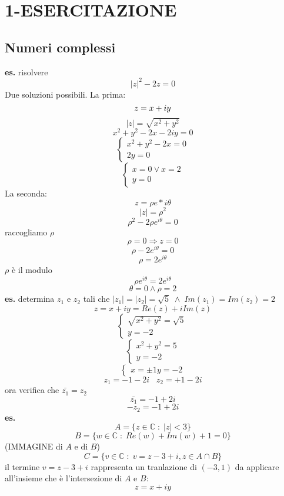 \section*{1-ESERCITAZIONE}
\subsection*{Numeri complessi}
\textbf{es.} risolvere
\[
    |z|^2 -2z = 0
\] 
Due soluzioni possibili. La prima:
\[
    z=x+iy\\
\]
\[
    |z| =\sqrt{x^2+y^2}
\] 
\[
    x^2 +y^2-2x-2iy = 0
\] 
\[
    \begin{cases}
        x^2+y^2 -2x = 0 \\
        2y = 0 
    \end{cases} 
\]
\[
    \begin{cases}
        x = 0 \lor x=2 \\
        y=0
    \end{cases} 
\]
La seconda:
\[
    z = \rho e*{i\theta}
\] 
\[
    |z| = \rho^2
\] 
\[
    \rho^2 -2\rho e ^{i\theta} = 0
\] 
raccogliamo $\rho$
\[
    \rho = 0 \Rightarrow z =0
\] 
\[
    \rho -2 e^{i\theta} = 0  
\]
\[
    \rho = 2e^{i\theta}
\] 
$\rho$ è il modulo
\[
    \rho e^{i\theta} = 2 e^{i\theta}
\] 
\[
    \theta = 0 \land \rho = 2
\] 
\newline
\textbf{es.} determina $z_1$ e $z_2$ tali che $|z_1| = |z_2| = \sqrt{5} \; \land \; Im(z_1) = Im(z_2) = 2 $
\[
    z = x+iy = Re(z) + iIm(z)
\] 
\[
    \begin{cases}
        \sqrt{x^2 + y^2} = \sqrt{5}\\
        y=-2
    \end{cases}
\] 
\[
    \begin{cases}
        x^2 + y^2 = 5\\
        y=-2
    \end{cases}
\] 
\[
    \begin{cases}
        x = \pm 1
        y=-2
    \end{cases}
\] 
\[
    z_1 = -1-2i \;\;\; z_2 = +1-2i
\] 
ora verifica che $\bar{z_1} = z_2$
\[
    \bar{z_1}= -1+2i
\]  
\[
    -z_2 = -1+2i
\] 
\newline
\textbf{es.}
\[
    A =\{z \in \mathbb{C} \;:\; |z| < 3\}
\] 
\[
    B = \{w \in \mathbb{C} \;:\; Re(w) +Im(w) +1 = 0\}
\] 
(IMMAGINE di $A$ e di $B$)
\[
    C=\{v \in \mathbb{C} \;:\; v = z-3+i , z \in A \cap B\}
\] 
il termine $v = z-3+i$ rappresenta un tranlazione di $(-3,1)$ da applicare all'insieme che è l'intersezione di $A$ e $B$:
\[
    z = x+iy
\] 
